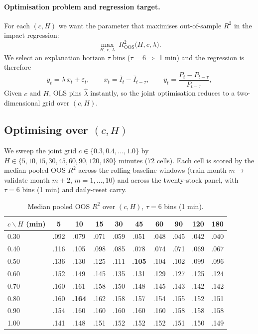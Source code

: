 \documentclass[11pt,a4paper]{article}
\begin{document}
\paragraph{Optimisation problem and regression target.}
For each $(c, H)$ we want the parameter that maximises out-of-sample
$R^2$ in the impact regression:
\[
  \max_{H,\,c,\,\lambda}\; R^2_{\text{OOS}}\!\bigl(H, c, \lambda\bigr).
\]
We select an explanation horizon
$\tau$ bins ($\tau = 6 \Rightarrow$ 1 min) and  the
regression is therefore
\[
  y_t = \lambda\,x_t + \varepsilon_t,
  \qquad
  x_t = \bar I_t - \bar I_{t-\tau},
  \qquad
  y_t = \frac{P_t - P_{t-\tau}}{P_{t-\tau}},
\]
Given $c$ and $H$,
OLS pins $\hat\lambda$ instantly, so the joint optimisation reduces to
a two-dimensional grid over $(c, H)$.


\subsection{Optimising over $(c, H)$}\label{sec:halflife}

We sweep the joint grid $c \in \{0.3, 0.4, \ldots, 1.0\}$ by
$H \in \{5, 10, 15, 30, 45, 60, 90, 120, 180\}$ minutes (72 cells). Each cell is
scored by the median pooled OOS $R^2$ across the rolling-baseline
windows (train month $m \to$ validate month $m+2$, $m = 1, \ldots, 10$)
and across the twenty-stock panel, with $\tau = 6$ bins (1 min) and
daily-reset carry.

\begin{table}[H]
\centering\small
\caption{Median pooled OOS $R^2$ over $(c, H)$, $\tau = 6$ bins (1 min).}
\label{tab:grid}
\setlength{\tabcolsep}{4pt}
\begin{tabular}{lccccccccc}
\toprule
$c \backslash H$ (min)
       & 5     & 10    & 15    & 30    & 45    & 60    & 90    & 120   & 180   \\
\midrule
0.30   & .092  & .079  & .071  & .059  & .051  & .048  & .045  & .042  & .040  \\
0.40   & .116  & .105  & .098  & .085  & .078  & .074  & .071  & .069  & .067  \\
0.50   & .136  & .130  & .125  & .111  & \textbf{.105}  & .104  & .102  & .099  & .096  \\
0.60   & .152  & .149  & .145  & .135  & .131  & .129  & .127  & .125  & .124  \\
0.70   & .160  & .161  & .158  & .150  & .148  & .145  & .143  & .142  & .142  \\
0.80   & .160  & \textbf{.164}  & .162  & .158  & .157  & .154  & .155  & .152  & .151  \\
0.90   & .154  & .160  & .160  & .160  & .160  & .160  & .158  & .158  & .158  \\
1.00   & .141  & .148  & .151  & .152  & .152  & .152  & .151  & .150  & .149  \\
\bottomrule
\end{tabular}
\end{table}
\end{document}
